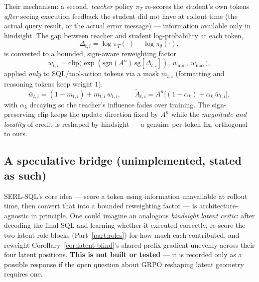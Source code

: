 \documentclass[11pt]{article}
\theoremstyle{definition}
\begin{document}
Their mechanism: a second, \emph{teacher} policy $\pi_T$ re-scores the student's own tokens \emph{after} seeing execution feedback the student did not have at rollout time (the actual query result, or the actual error message) --- information available only in hindsight. The gap between teacher and student log-probability at each token,
\[
\Delta_{t,i} = \log\pi_T(\cdot) - \log\pi_\theta(\cdot),
\]
is converted to a bounded, sign-aware reweighting factor
\[
w_{t,i} = \mathrm{clip}\big(\exp(\mathrm{sgn}(A^n)\,\mathrm{sg}[\Delta_{t,i}]),\ w_{\min},\ w_{\max}\big),
\]
applied \emph{only} to SQL/tool-action tokens via a mask $m_{t,i}$ (formatting and reasoning tokens keep weight $1$):
\[
\bar w_{t,i} = (1-m_{t,i}) + m_{t,i}\,w_{t,i},
\qquad
\widetilde A_{t,i} = A^n\big[(1-\alpha_k) + \alpha_k\,\bar w_{t,i}\big],
\]
with $\alpha_k$ decaying so the teacher's influence fades over training. The sign-preserving clip keeps the update direction fixed by $A^n$ while the \emph{magnitude and locality} of credit is reshaped by hindsight --- a genuine per-token fix, orthogonal to ours.

\begin{center}
\end{center}

\subsection{A speculative bridge (unimplemented, stated as such)}

SERL-SQL's core idea --- score a token using information unavailable at rollout time, then convert that into a bounded reweighting factor --- is architecture-agnostic in principle. One could imagine an analogous \emph{hindsight latent critic}: after decoding the final SQL and learning whether it executed correctly, re-score the two latent role blocks (Part~\ref{part:roles}) for how much each contributed, and reweight Corollary~\ref{cor:latent-blind}'s shared-prefix gradient unevenly across their four latent positions. \textbf{This is not built or tested} --- it is recorded only as a possible response if the open question about GRPO reshaping latent geometry requires one.
\end{document}
